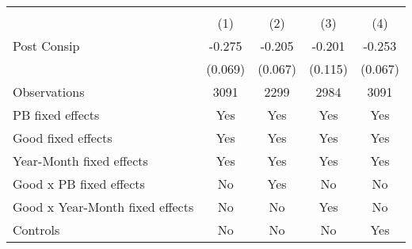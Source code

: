 \begin{tabular}{l*{4}{c}}
\hline\hline
                    &\multicolumn{4}{c}{ }                              \\
                    &\multicolumn{1}{c}{(1)}&\multicolumn{1}{c}{(2)}&\multicolumn{1}{c}{(3)}&\multicolumn{1}{c}{(4)}\\
\hline
Post Consip         &      -0.275&      -0.205&      -0.201&      -0.253\\
                    &     (0.069)&     (0.067)&     (0.115)&     (0.067)\\
\hline
Observations        &        3091&        2299&        2984&        3091\\
PB fixed effects    &         Yes&         Yes&         Yes&         Yes\\
Good fixed effects  &         Yes&         Yes&         Yes&         Yes\\
Year-Month fixed effects&         Yes&         Yes&         Yes&         Yes\\
Good x PB fixed effects&          No&         Yes&          No&          No\\
Good x Year-Month fixed effects&          No&          No&         Yes&          No\\
Controls            &          No&          No&          No&         Yes\\
\hline\hline
\end{tabular}
